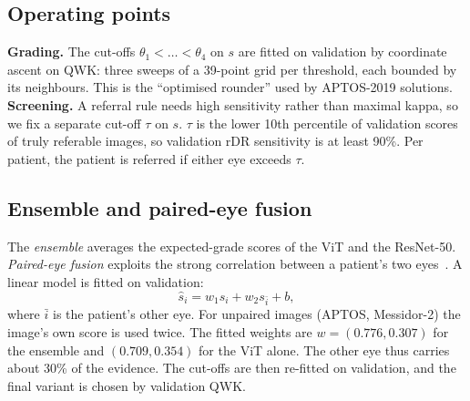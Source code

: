\documentclass[conference,a4paper]{IEEEtran}
\begin{document}
\subsection{Operating points}
\textbf{Grading.} The cut-offs $\theta_1<\dots<\theta_4$ on $s$ are fitted on validation by coordinate ascent on QWK: three sweeps of a 39-point grid per threshold, each bounded by its neighbours. This is the ``optimised rounder'' used by APTOS-2019 solutions.
\textbf{Screening.} A referral rule needs high sensitivity rather than maximal kappa, so we fix a separate cut-off $\tau$ on $s$. $\tau$ is the lower 10th percentile of validation scores of truly referable images, so validation rDR sensitivity is at least 90\%.
Per patient, the patient is referred if either eye exceeds $\tau$.

\subsection{Ensemble and paired-eye fusion}
The \emph{ensemble} averages the expected-grade scores of the ViT and the ResNet-50.
\emph{Paired-eye fusion} exploits the strong correlation between a patient's two eyes~\cite{graham,huang}. A linear model is fitted on validation:
\begin{equation}
\hat s_i = w_1 s_i + w_2 s_{\bar i} + b,
\end{equation}
where $\bar i$ is the patient's other eye. For unpaired images (APTOS, Messidor-2) the image's own score is used twice.
The fitted weights are $w=(0.776, 0.307)$ for the ensemble and $(0.709, 0.354)$ for the ViT alone. The other eye thus carries about 30\% of the evidence.
The cut-offs are then re-fitted on validation, and the final variant is chosen by validation QWK.
\end{document}

